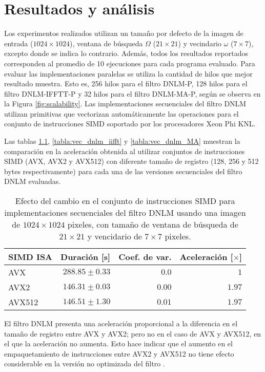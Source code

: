 \chapter{Resultados y análisis}
\label{ch:res}

Los experimentos realizados utilizan un tama\~no por defecto de la imagen de entrada ($1024 \times 1024$), ventana de búsqueda $\Omega$  ($21 \times 21$) y vecindario $\omega$ ($7 \times 7$), excepto donde se indica lo contrario. Adem\'as, todos los resultados reportados corresponden al promedio de 10 ejecuciones para cada programa evaluado.  Para evaluar las implementaciones paralelas se utiliza la cantidad de hilos que mejor resultado muestra. Esto es, 256 hilos para el filtro DNLM-P, 128 hilos para el filtro DNLM-IFFTT-P y 32 hilos para el filtro DNLM-MA-P, según se observa en la Figura \ref{fig:scalability}. Las implementaciones secuenciales del filtro DNLM utilizan primitivas que vectorizan automáticamente las operaciones para el conjunto de instrucciones SIMD soportado por los procesadores Xeon Phi KNL.

Las tablas \ref{tabla:vec_dnlm}, \ref{tabla:vec_dnlm_iifft} y \ref{tabla:vec_dnlm_MA} muestran la comparación en la aceleración obtenida al utilizar conjuntos de instrucciones SIMD (AVX, AVX2 y AVX512) con diferente tama\~no de registro (128, 256 y 512 bytes respectivamente) para cada una de las versiones secuenciales del filtro DNLM evaluadas. 


\begin{table}
\protect\caption[Efecto de vectorización con instrucciones SIMD para el filtro DNLM]{Efecto del cambio en el conjunto de instrucciones SIMD para implementaciones secuenciales del filtro DNLM usando una imagen de  $1024 \times 1024$ pixeles, con tama\~no de ventana de búsqueda de $21 \times 21$ y vencidario de $7 \times 7$ pixeles. \label{tabla:vec_dnlm}}
\centering
\begin{tabular}{lrrr}
SIMD ISA & Duración [s]& Coef. de var. & Aceleración [$\times$] \tabularnewline
\hline
AVX & $288.85\pm0.33$ & $0.0$ & $1$\tabularnewline
AVX2 & $146.31\pm0.03$ & $0.00$ & $1.97$\tabularnewline
AVX512 & $146.51\pm 1.30$ & $0.01$ & $1.97$ \tabularnewline
\end{tabular}
\end{table}

El filtro DNLM presenta una aceleración proporcional a la diferencia en el tama\~no de registro entre AVX y AVX2; pero no en el caso de AVX y AVX512, en el que la aceleración no aumenta. Esto hace indicar que el aumento en el empaquetamiento de instrucciones entre AVX2 y AVX512 no tiene efecto considerable en la versión no optimizada del filtro . 



